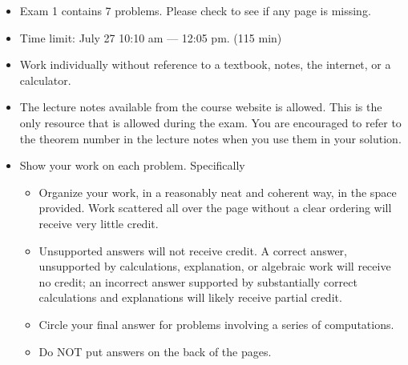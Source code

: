 \documentclass[12pt]{amsart}
\theoremstyle{definition}
\begin{document}


\vspace{3em}

\begin{itemize}
\item Exam 1 contains 7 problems. Please check to see if any page is missing.\vspace{1em}
\item Time limit: July 27 10:10 am --- 12:05 pm. (115 min)\vspace{1em}
\item Work individually without reference to a textbook, notes, the internet, or a calculator.\vspace{1em}
\item The lecture notes available from the course website is allowed. This is the only resource that is allowed during the exam. You are encouraged to refer to the theorem number in the lecture notes when you use them in your solution.\vspace{1em}
\item Show your work on each problem. Specifically\vspace{0.5em}
\begin{itemize}
\item Organize your work, in a reasonably neat and coherent way, in the space provided. Work scattered all over the page without a clear ordering
will receive very little credit.\vspace{0.5em}
\item Unsupported answers will not receive credit. A correct answer, unsupported by calculations, explanation, or algebraic work will receive no credit; an incorrect answer supported by substantially correct calculations and explanations will likely receive partial credit.\vspace{0.5em}
\item Circle your final answer for problems involving a series of computations.\vspace{0.5em}
\item Do NOT put answers on the back of the pages.
\end{itemize}
\end{itemize}



\vspace{2em}
\newpage
\end{document}
